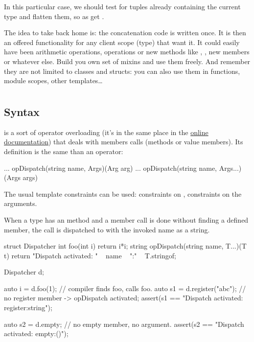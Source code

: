 In this particular case, we should test for tuples already containing the current type and flatten them, so as get .

The idea to take back home is: the concatenation code is written once. It is then an offered functionality for any client scope (type) that want it. It could easily have been arithmetic operations,  operations or new methods like , , new members or whatever else. Build you own set of mixins and use them freely. And remember they are not limited to classes and structs: you can also use them in functions, module scopes, other templates\ldots


\section{} \label{opdispatch}

\subsection{Syntax}\label{opdispatchsyntax}

 is a sort of operator overloading (it's in the same place in the \href{www.d-programming-language.org/operator.html}{online documentation}) that deals with members calls (methods or value members). Its definition is the same than an operator:

\begin{dcode}
... opDispatch(string name, Args)(Arg arg)
... opDispatch(string name, Args...)(Args args)
\end{dcode}

The usual template constraints can be used: constraints on , constraints on the arguments.

When a type has an  method and a member call is done without finding a defined member, the call is dispatched to  with the invoked name as a string.

\begin{dcode}
struct Dispatcher
{
    int foo(int i) { return i*i;}
    string opDispatch(string name, T...)(T t)
    {
        return "Dispatch activated: " ~ name ~ ":" ~ T.stringof;
    }
}

Dispatcher d;

auto i = d.foo(1); // compiler finds foo, calls foo.
auto s1 = d.register("abc"); // no register member -> opDispatch activated;
assert(s1 == "Dispatch activated: register:string");

auto s2 = d.empty; // no empty member, no argument.
assert(s2 == "Dispatch activated: empty:()");
\end{dcode}

